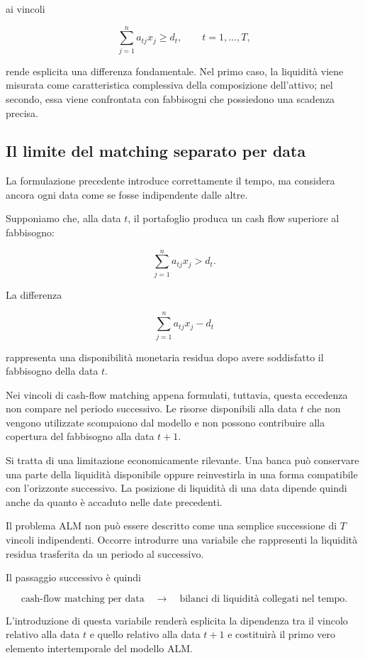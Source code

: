 \noindent ai vincoli

\[
\sum_{j=1}^{n}a_{tj}x_j
\geq
d_t,
\qquad
t=1,\ldots,T,
\]

\noindent rende esplicita una differenza fondamentale. Nel primo caso, la liquidit\`a
viene misurata come caratteristica complessiva della composizione
dell'attivo; nel secondo, essa viene confrontata con fabbisogni che possiedono una
scadenza precisa.

\subsection{Il limite del matching separato per data}

La formulazione precedente introduce correttamente il tempo, ma considera
ancora ogni data come se fosse indipendente dalle altre.

Supponiamo che, alla data $t$, il portafoglio produca un cash flow superiore
al fabbisogno:

\[
\sum_{j=1}^{n}a_{tj}x_j
>
d_t.
\]

La differenza

\[
\sum_{j=1}^{n}a_{tj}x_j-d_t
\]

\noindent rappresenta una disponibilit\`a monetaria residua dopo avere soddisfatto il
fabbisogno della data $t$.

Nei vincoli di cash-flow matching appena formulati, tuttavia, questa
eccedenza non compare nel periodo successivo. Le risorse disponibili alla
data $t$ che non vengono utilizzate scompaiono dal modello e non possono
contribuire alla copertura del fabbisogno alla data $t+1$.

Si tratta di una limitazione economicamente rilevante. Una banca pu\`o
conservare una parte della liquidit\`a disponibile oppure reinvestirla in una
forma compatibile con l'orizzonte successivo. La posizione di liquidit\`a di
una data dipende quindi anche da quanto \`e accaduto nelle date precedenti.

Il problema ALM non pu\`o essere descritto come una semplice successione di
$T$ vincoli indipendenti. Occorre introdurre una variabile che rappresenti la
liquidit\`a residua trasferita da un periodo al successivo.

Il passaggio successivo \`e quindi

\[
\boxed{
\text{cash-flow matching per data}
\quad\longrightarrow\quad
\text{bilanci di liquidit\`a collegati nel tempo}.
}
\]

L'introduzione di questa variabile render\`a esplicita la dipendenza tra il
vincolo relativo alla data $t$ e quello relativo alla data $t+1$ e
costituir\`a il primo vero elemento intertemporale del modello ALM.

